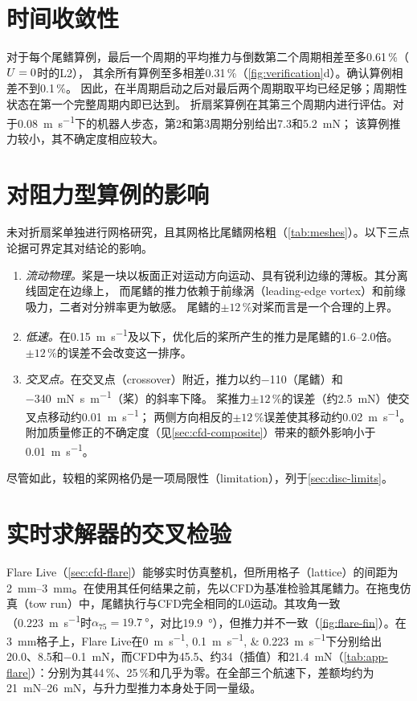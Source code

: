 \section{时间收敛性}
\label{sec:ver-time}

对于每个尾鳍算例，最后一个周期的平均推力与倒数第二个周期相差至多0.61\,\%（$U=0$时的L2），
其余所有算例至多相差0.31\,\%（\cref{fig:verification}d）。确认算例相差不到0.1\,\%。
因此，在半周期启动之后对最后两个周期取平均已经足够；周期性状态在第一个完整周期内即已达到。
折扇桨算例在其第三个周期内进行评估。对于\SI{0.08}{\metre\per\second}下的机器人步态，第2和第3周期分别给出\SI{7.3}{}和\SI{5.2}{\milli\newton}；
该算例推力较小，其不确定度相应较大。

\section{对阻力型算例的影响}
\label{sec:ver-drag}

未对折扇桨单独进行网格研究，且其网格比尾鳍网格粗（\cref{tab:meshes}）。以下三点论据可界定其对结论的影响。
\begin{enumerate}
  \item \emph{流动物理。}桨是一块以板面正对运动方向运动、具有锐利边缘的薄板。其分离线固定在边缘上，
        而尾鳍的推力依赖于前缘涡（leading-edge vortex）和前缘吸力，二者对分辨率更为敏感。
        尾鳍的$\pm12$\,\%对桨而言是一个合理的上界。
  \item \emph{低速。}在\SI{0.15}{\metre\per\second}及以下，优化后的桨所产生的推力是尾鳍的1.6--2.0倍。
        $\pm12$\,\%的误差不会改变这一排序。
  \item \emph{交叉点。}在交叉点（crossover）附近，推力以约\SI{-110}{}（尾鳍）和\SI{-340}{\milli\newton\second\per\metre}（桨）的斜率下降。
        桨推力$\pm12$\,\%的误差（约\SI{2.5}{\milli\newton}）使交叉点移动约\SI{0.01}{\metre\per\second}；
        两侧方向相反的$\pm12$\,\%误差使其移动约\SI{0.02}{\metre\per\second}。
        附加质量修正的不确定度（见\cref{sec:cfd-composite}）带来的额外影响小于\SI{0.01}{\metre\per\second}。
\end{enumerate}
尽管如此，较粗的桨网格仍是一项局限性（limitation），列于\cref{sec:disc-limits}。

\section{实时求解器的交叉检验}
\label{sec:ver-flare}
\label{sec:res-flare}

Flare Live（\cref{sec:cfd-flare}）能够实时仿真整机，但所用格子（lattice）的间距为\SIrange{2}{3}{\milli\metre}。在使用其任何结果之前，先以CFD为基准检验其尾鳍力。在拖曳仿真（tow run）中，尾鳍执行与CFD完全相同的L0运动。其攻角一致（\SI{0.223}{\metre\per\second}时$\alpha_{75}=\SI{19.7}{\degree}$，对比\SI{19.9}{\degree}），但推力并不一致（\cref{fig:flare-fin}）。在\SI{3}{\milli\metre}格子上，Flare Live在\SIlist{0;0.1;0.223}{\metre\per\second}下分别给出\SI{20.0}{}、\SI{8.5}{}和\SI{-0.1}{\milli\newton}，而CFD中为\SI{45.5}{}、约\SI{34}{}（插值）和\SI{21.4}{\milli\newton}（\cref{tab:app-flare}）：分别为其44\,\%、25\,\%和几乎为零。在全部三个航速下，差额均约为\SIrange{21}{26}{\milli\newton}，与升力型推力本身处于同一量级。

